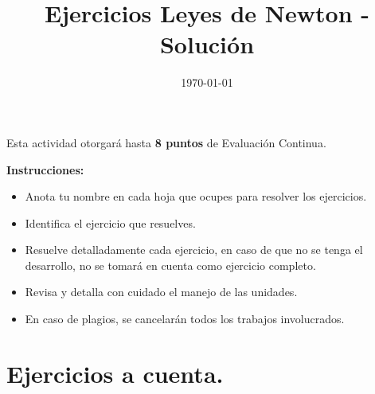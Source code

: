 \documentclass[14pt]{extarticle}
\title{\vspace*{-2cm} Ejercicios Leyes de Newton - Solución\vspace{-5ex}}
\date{\today}
\begin{document}
\maketitle

Esta actividad otorgará hasta \textbf{8 puntos} de Evaluación Continua.
\vspace*{0.5cm}

\textbf{Instrucciones: }
\begin{itemize}
\item Anota tu nombre en cada hoja que ocupes para resolver los ejercicios.
\item Identifica el ejercicio que resuelves.
\item Resuelve detalladamente cada ejercicio, en caso de que no se tenga el desarrollo, no se tomará en cuenta como ejercicio completo.
\item Revisa y detalla con cuidado el manejo de las unidades.
\item En caso de plagios, se cancelarán todos los trabajos involucrados.
\end{itemize}

\section{Ejercicios a cuenta.}
\end{document}
